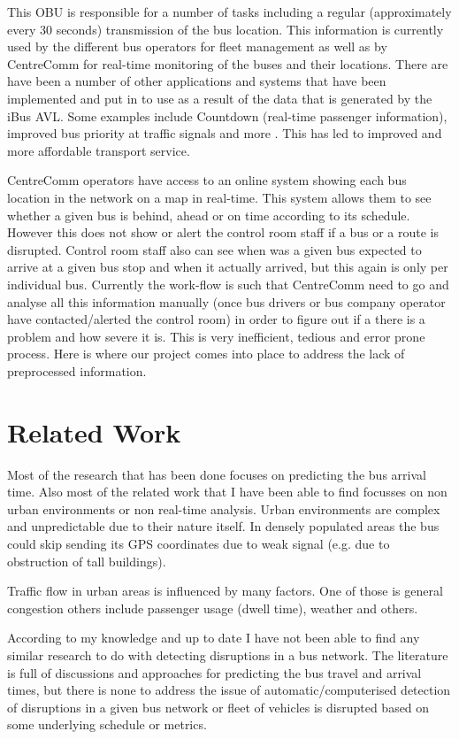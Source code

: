 This OBU is responsible for a number of tasks including a regular (approximately every 30 seconds) transmission of the bus location. This information is currently used by the different bus operators for fleet management as well as by CentreComm for real-time monitoring of the buses and their locations. There are have been a number of other applications and systems that have been implemented and put in to use as a result of the data that is generated by the iBus AVL. Some examples include Countdown (real-time passenger information), improved bus priority at traffic signals and more \cite{Hounsell201276}. This has led to improved and more affordable transport service.

CentreComm operators have access to an online system showing each bus location in the network on a map in real-time. This system allows them to see whether a given bus is behind, ahead or on time according to its schedule. However this does not show or alert the control room staff if a bus or a route is disrupted. Control room staff also can see when was a given bus expected to arrive at a given bus stop and when it actually arrived, but this again is only per individual bus. Currently the work-flow is such that CentreComm need to go and analyse all this information manually (once bus drivers or bus company operator have contacted/alerted the control room) in order to figure out if a there is a problem and how severe it is. This is very inefficient, tedious and error prone process. Here is where our project comes into place to address the lack of preprocessed information.

\section{Related Work}
Most of the research that has been done focuses on predicting the bus arrival time. Also most of the related work that I have been able to find focusses on non urban environments or non real-time analysis. Urban environments are complex and unpredictable due to their nature itself. In densely populated areas the bus could skip sending its GPS coordinates due to weak signal (e.g. due to obstruction of tall buildings).

Traffic flow in urban areas is influenced by many factors. One of those is general congestion others include passenger usage (dwell time), weather and others.

According to my knowledge and up to date I have not been able to find any similar research to do with detecting disruptions in a bus network. The literature is full of discussions and approaches for predicting the bus travel and arrival times, but there is none to address the issue of automatic/computerised detection of disruptions in a given bus network or fleet of vehicles is disrupted based on some underlying schedule or metrics.

